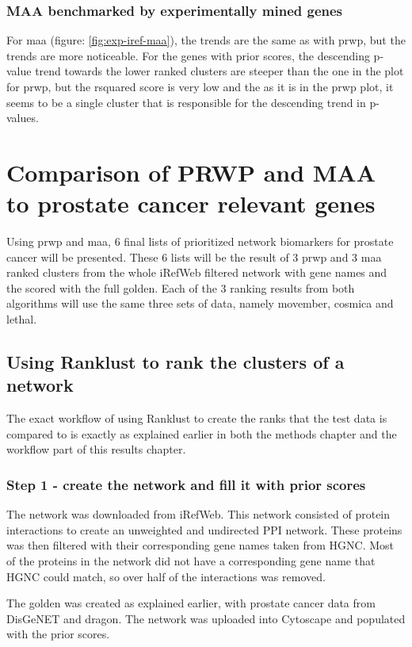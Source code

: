 \subsection{MAA benchmarked by experimentally mined genes}
For \gls{maa} (figure: \ref{fig:exp-iref-maa}), the trends are the same as with
\gls{prwp}, but the trends are more noticeable. For the genes with prior scores,
the descending p-value trend towards the lower ranked clusters are steeper than
the one in the plot for \gls{prwp}, but the \gls{rsquared} score is very low and
the as it is in the \gls{prwp} plot, it seems to be a single cluster that is
responsible for the descending trend in p-values.

\chapter{Comparison of PRWP and MAA to prostate cancer relevant genes}
Using \gls{prwp} and \gls{maa}, 6 final lists of prioritized network biomarkers
for prostate cancer will be presented. These 6 lists will be the result of
3 \gls{prwp} and 3 \gls{maa} ranked clusters from the whole iRefWeb filtered
network with gene names and the scored with the full \gls{golden}. Each of the
3 ranking results from both algorithms will use the same three sets of data,
namely movember, cosmica and lethal.

\section{Using Ranklust to rank the clusters of a network}
The exact workflow of using Ranklust to create the ranks that the test data is
compared to is exactly as explained earlier in both the methods chapter and the
workflow part of this results chapter.

\subsection{Step 1 - create the network and fill it with prior scores}
The network was downloaded from iRefWeb. This network consisted of protein
interactions to create an unweighted and undirected PPI network. These proteins
was then filtered with their corresponding gene names taken from HGNC. Most of
the proteins in the network did not have a corresponding gene name that HGNC
could match, so over half of the interactions was removed.

The \gls{golden} was created as explained earlier, with prostate cancer data
from DisGeNET and \gls{dragon}. The network was uploaded into Cytoscape and
populated with the prior scores. 

